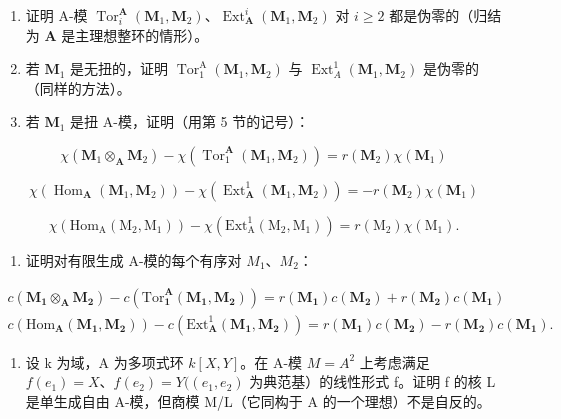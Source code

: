 \begin{enumerate}
\def\labelenumi{(\alph{enumi})}
\item
  证明 A-模 \(\operatorname{Tor}_i^{\mathbf{A}}(\mathbf{M}_1, \mathbf{M}_2)\)、\(\operatorname{Ext}_{\mathbf{A}}^{i}(\mathbf{M}_1, \mathbf{M}_2)\) 对 \(i \geqslant 2\) 都是伪零的（归结为 \(\mathbf{A}\) 是主理想整环的情形）。
\item
  若 \(\mathbf{M}_1\) 是无扭的，证明 \(\operatorname{Tor}_1^{\mathrm{A}}(\mathbf{M}_1, \mathbf{M}_2)\) 与 \(\operatorname{Ext}_A^1(\mathbf{M}_1, \mathbf{M}_2)\) 是伪零的（同样的方法）。
\item
  若 \(\mathbf{M}_1\) 是扭 A-模，证明（用第 5 节的记号）：
\end{enumerate}

\[
\chi (\mathbf {M} _ {1} \otimes_ {\mathbf {A}} \mathbf {M} _ {2}) - \chi (\operatorname{Tor} _ {1} ^ {\mathbf {A}} (\mathbf {M} _ {1}, \mathbf {M} _ {2})) = r (\mathbf {M} _ {2}) \chi (\mathbf {M} _ {1})
\]

\[
\chi (\operatorname{Hom} _ {\mathbf {A}} (\mathbf {M} _ {1}, \mathbf {M} _ {2})) - \chi (\operatorname{Ext} _ {\mathbf {A}} ^ {1} (\mathbf {M} _ {1}, \mathbf {M} _ {2})) = - r (\mathbf {M} _ {2}) \chi (\mathbf {M} _ {1})
\]

\[
\chi (\mathrm{Hom} _ {\mathrm{A}} (\mathrm{M} _ {2}, \mathrm{M} _ {1})) - \chi (\mathrm{Ext} _ {\mathrm{A}} ^ {1} (\mathrm{M} _ {2}, \mathrm{M} _ {1})) = r (\mathrm{M} _ {2}) \chi (\mathrm{M} _ {1}).
\]

\begin{enumerate}
\def\labelenumi{(\alph{enumi})}
\setcounter{enumi}{3}
\tightlist
\item
  证明对有限生成 A-模的每个有序对 \(M_{1}\)、\(M_{2}\)：
\end{enumerate}

\[
\begin{array}{r} c (\mathbf {M _ {1}} \otimes_ {\mathbf {A}} \mathbf {M _ {2}}) - c (\mathrm{Tor} _ {\mathbf {1}} ^ {\mathbf {A}} (\mathbf {M _ {1}}, \mathbf {M _ {2}})) = r (\mathbf {M _ {1}}) c (\mathbf {M _ {2}}) + r (\mathbf {M _ {2}}) c (\mathbf {M _ {1}}) \\ c (\mathrm{Hom} _ {\mathbf {A}} (\mathbf {M _ {1}}, \mathbf {M _ {2}})) - c (\mathrm{Ext} _ {\mathbf {A}} ^ {1} (\mathbf {M _ {1}}, \mathbf {M _ {2}})) = r (\mathbf {M _ {1}}) c (\mathbf {M _ {2}}) - r (\mathbf {M _ {2}}) c (\mathbf {M _ {1}}). \end{array}
\]

\begin{enumerate}
\def\labelenumi{\arabic{enumi}.}
\setcounter{enumi}{8}
\tightlist
\item
  设 k 为域，A 为多项式环 \(k[X,Y]\)。在 A-模 \(M = A^{2}\) 上考虑满足 \(f(e_{1}) = X\)、\(f(e_{2}) = Y((e_{1}, e_{2})\) 为典范基）的线性形式 f。证明 f 的核 L 是单生成自由 A-模，但商模 M/L（它同构于 A 的一个理想）不是自反的。
\end{enumerate}

